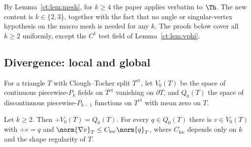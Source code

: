 By Lemma~\ref{ct:lem:mesh}, for $k\ge4$ the paper applies verbatim to $\Th$. The new content is $k\in\{2,3\}$, together with the fact that no angle or singular-vertex hypothesis on the macro mesh is needed for any $k$. The proofs below cover all $k\ge2$ uniformly, except the $C^1$ test field of Lemma~\ref{ct:lem:vphi}.

\subsection{Divergence: local and global}

For a triangle $T$ with Clough--Tocher split $T^{\mathrm{ct}}$, let $V_0(T)$ be the space of continuous piecewise-$P_k$ fields on $T^{\mathrm{ct}}$ vanishing on $\partial T$, and $Q_0(T)$ the space of discontinuous piecewise-$P_{k-1}$ functions on $T^{\mathrm{ct}}$ with mean zero on $T$.

\begin{lemma}\label{ct:lem:local}
Let $k\ge2$. Then $\div V_0(T)=Q_0(T)$. For every $q\in Q_0(T)$ there is $v\in V_0(T)$ with $\div v=q$ and $\norm{\nabla v}_T\le C_{\mathrm{loc}}\norm{q}_T$, where $C_{\mathrm{loc}}$ depends only on $k$ and the shape regularity of $T$.
\end{lemma}

